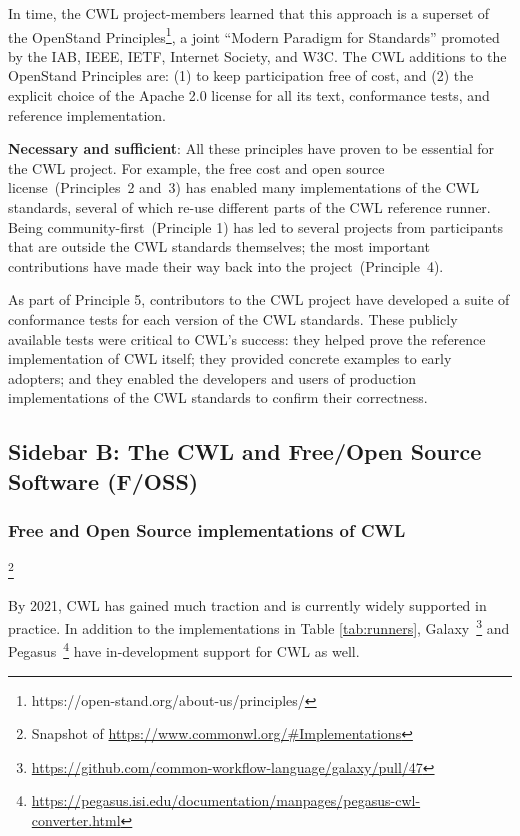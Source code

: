\documentclass[sigconf,revew,screen,timestamp,nonacm]{acmart}
\begin{document}
In time, the CWL project-members learned that this approach is a superset of the OpenStand Principles\footnote{https://open-stand.org/about-us/principles/}, a joint ``Modern Paradigm for Standards'' promoted by the IAB, IEEE, IETF, Internet Society, and W3C. The CWL additions to the OpenStand Principles are: (1) to keep participation free of cost, and (2) the explicit choice of the Apache 2.0 license for all its text, conformance tests, and reference implementation.

\textbf{Necessary and sufficient}: All these principles have proven to be essential for the CWL project. For example, the free cost and open source license~(Principles~2 and~3) has enabled many implementations of the CWL standards, several of which re-use different parts of the CWL reference runner. Being community-first~(Principle 1) has led to several projects from participants that are outside the CWL standards themselves; the most important contributions have made their way back into the project~(Principle~4).

As part of Principle 5, contributors to the CWL project have developed a suite of conformance tests for each version of the CWL standards. These publicly available tests were critical to CWL's success: they helped prove the reference implementation of CWL itself; they provided concrete examples to early adopters; and they enabled the developers and users of production implementations of the CWL standards to confirm their correctness.

\subsection{Sidebar B: The CWL and Free/Open Source Software (F/OSS)}\label{sec:sidebar:b}

\subsubsection{Free and Open Source implementations of CWL}\footnote{Snapshot of \url{https://www.commonwl.org/\#Implementations}}

By 2021, CWL has gained much traction and is currently widely supported in practice. In addition to the implementations in Table \ref{tab:runners}, Galaxy~\cite{afgan_galaxy_2018}\footnote{\url{https://github.com/common-workflow-language/galaxy/pull/47}} and Pegasus~\cite{deelman_pegasus_2015}\footnote{\url{https://pegasus.isi.edu/documentation/manpages/pegasus-cwl-converter.html}} have in-development support for CWL as well.
\end{document}
